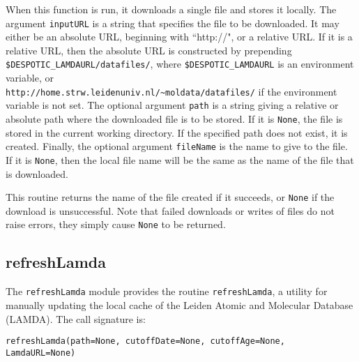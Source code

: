 \documentclass[12pt]{article}
\begin{document}
When this function is run, it downloads a single file and stores it locally. The argument \verb=inputURL= is a string that specifies the file to be downloaded. It may either be an absolute URL, beginning with ``http://", or a relative URL. If it is a relative URL, then the absolute URL is constructed by prepending \verb=$DESPOTIC_LAMDAURL/datafiles/=, where \verb=$DESPOTIC_LAMDAURL= is an environment variable, or\\
\verb=http://home.strw.leidenuniv.nl/~moldata/datafiles/= if the environment variable is not set. The optional argument \verb=path= is a string giving a relative or absolute path where the downloaded file is to be stored. If it is \verb=None=, the file is stored in the current working directory. If the specified path does not exist, it is created. Finally, the optional argument \verb=fileName= is the name to give to the file. If it is \verb=None=, then the local file name will be the same as the name of the file that is downloaded.

This routine returns the name of the file created if it succeeds, or \verb=None= if the download is unsuccessful. Note that failed downloads or writes of files do not raise errors, they simply cause \verb=None= to be returned.

\clearpage

\subsection{refreshLamda}
\label{sec:refreshLamda}

The \verb=refreshLamda= module provides the routine \verb=refreshLamda=, a utility for manually updating the local cache of the Leiden Atomic and Molecular Database (LAMDA). The call signature is:

\begin{verbatim}
refreshLamda(path=None, cutoffDate=None, cutoffAge=None, LamdaURL=None)
\end{verbatim}                     
\end{document}
